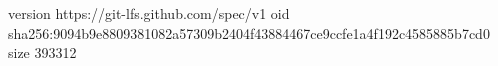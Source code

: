 version https://git-lfs.github.com/spec/v1
oid sha256:9094b9e8809381082a57309b2404f43884467ce9ccfe1a4f192c4585885b7cd0
size 393312
